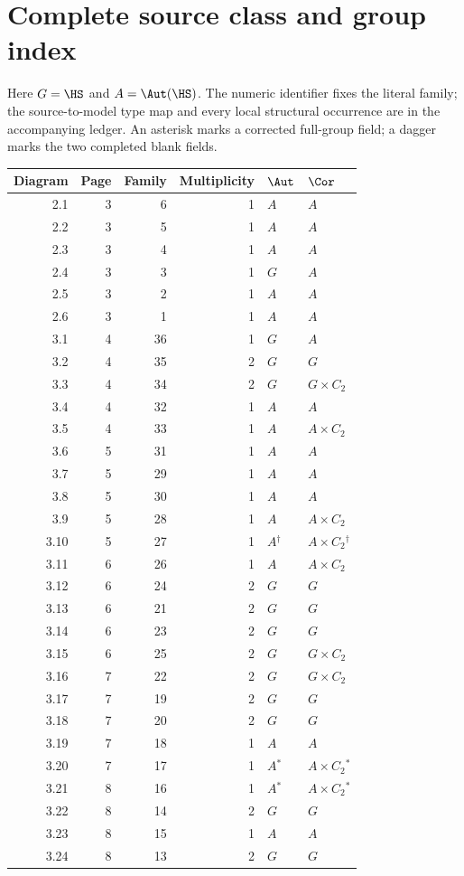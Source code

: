 \section{Complete source class and group index}
Here $G=\HS$ and $A=\Aut(\HS)$. The numeric identifier fixes the literal family; the source-to-model type map and every local structural occurrence are in the accompanying ledger. An asterisk marks a corrected full-group field; a dagger marks the two completed blank fields.
\small
\begin{longtable}{rrrrll}
\toprule Diagram&Page&Family&Multiplicity&$\Aut$&$\Cor$\\\midrule\endhead
2.1&3&6&1&$A$&$A$\\
2.2&3&5&1&$A$&$A$\\
2.3&3&4&1&$A$&$A$\\
2.4&3&3&1&$G$&$A$\\
2.5&3&2&1&$A$&$A$\\
2.6&3&1&1&$A$&$A$\\
3.1&4&36&1&$G$&$A$\\
3.2&4&35&2&$G$&$G$\\
3.3&4&34&2&$G$&$G\times C_2$\\
3.4&4&32&1&$A$&$A$\\
3.5&4&33&1&$A$&$A\times C_2$\\
3.6&5&31&1&$A$&$A$\\
3.7&5&29&1&$A$&$A$\\
3.8&5&30&1&$A$&$A$\\
3.9&5&28&1&$A$&$A\times C_2$\\
3.10&5&27&1&$A$$^\dagger$&$A\times C_2$$^\dagger$\\
3.11&6&26&1&$A$&$A\times C_2$\\
3.12&6&24&2&$G$&$G$\\
3.13&6&21&2&$G$&$G$\\
3.14&6&23&2&$G$&$G$\\
3.15&6&25&2&$G$&$G\times C_2$\\
3.16&7&22&2&$G$&$G\times C_2$\\
3.17&7&19&2&$G$&$G$\\
3.18&7&20&2&$G$&$G$\\
3.19&7&18&1&$A$&$A$\\
3.20&7&17&1&$A$$^*$&$A\times C_2$$^*$\\
3.21&8&16&1&$A$$^*$&$A\times C_2$$^*$\\
3.22&8&14&2&$G$&$G$\\
3.23&8&15&1&$A$&$A$\\
3.24&8&13&2&$G$&$G$\\

\end{longtable}
